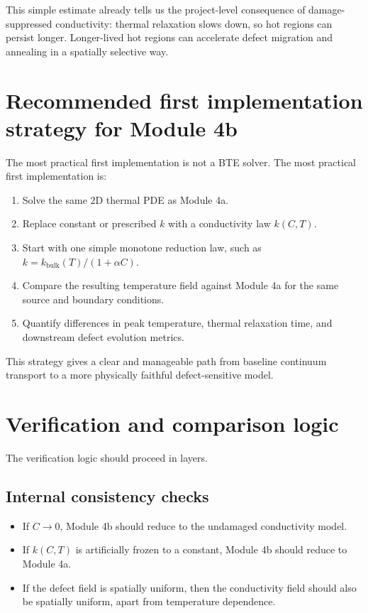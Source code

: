 \documentclass[11pt]{article}
\begin{document}
This simple estimate already tells us the project-level consequence of damage-suppressed conductivity: thermal relaxation slows down, so hot regions can persist longer. Longer-lived hot regions can accelerate defect migration and annealing in a spatially selective way.

\section{Recommended first implementation strategy for Module 4b}

The most practical first implementation is not a BTE solver. The most practical first implementation is:
\begin{enumerate}[label=\arabic*.]
    \item Solve the same 2D thermal PDE as Module 4a.
    \item Replace constant or prescribed $k$ with a conductivity law $k(C,T)$.
    \item Start with one simple monotone reduction law, such as $k=k_{\mathrm{bulk}}(T)/(1+\alpha C)$.
    \item Compare the resulting temperature field against Module 4a for the same source and boundary conditions.
    \item Quantify differences in peak temperature, thermal relaxation time, and downstream defect evolution metrics.
\end{enumerate}

This strategy gives a clear and manageable path from baseline continuum transport to a more physically faithful defect-sensitive model.

\section{Verification and comparison logic}

The verification logic should proceed in layers.

\subsection{Internal consistency checks}
\begin{itemize}
    \item If $C\to 0$, Module 4b should reduce to the undamaged conductivity model.
    \item If $k(C,T)$ is artificially frozen to a constant, Module 4b should reduce to Module 4a.
    \item If the defect field is spatially uniform, then the conductivity field should also be spatially uniform, apart from temperature dependence.
\end{itemize}
\end{document}
